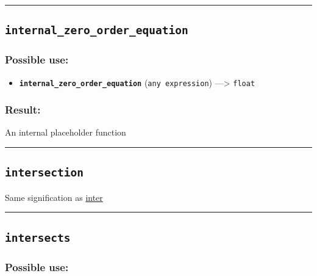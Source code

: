 \documentclass[]{book}
\providecommand{\tightlist}{%
  \setlength{\itemsep}{0pt}\setlength{\parskip}{0pt}}
\theoremstyle{definition}
\theoremstyle{definition}
\theoremstyle{definition}
\theoremstyle{remark}
\begin{document}
\begin{center}\rule{0.5\linewidth}{\linethickness}\end{center}

\subsection{\texorpdfstring{\texttt{internal\_zero\_order\_equation}}{internal\_zero\_order\_equation}}\label{internal_zero_order_equation}

\subsubsection{Possible use:}\label{possible-use-281}

\begin{itemize}
\tightlist
\item
  \textbf{\texttt{internal\_zero\_order\_equation}}
  (\texttt{any\ expression}) ---\textgreater{} \texttt{float}
\end{itemize}

\subsubsection{Result:}\label{result-271}

An internal placeholder function

\begin{center}\rule{0.5\linewidth}{\linethickness}\end{center}

\subsection{\texorpdfstring{\texttt{intersection}}{intersection}}\label{intersection}

Same signification as \href{OperatorsIM\#inter}{inter}

\begin{center}\rule{0.5\linewidth}{\linethickness}\end{center}

\subsection{\texorpdfstring{\texttt{intersects}}{intersects}}\label{intersects}

\subsubsection{Possible use:}\label{possible-use-282}
\end{document}
